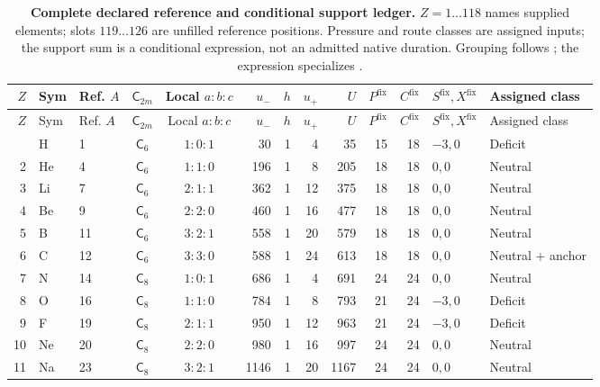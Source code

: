 {\scriptsize
\setlength{\tabcolsep}{3.0pt}
\begin{longtable}{@{}rllccrrrrrrll@{}}
\caption{\textbf{Complete declared reference and conditional support ledger.} $Z=1\dots118$ names supplied elements; slots $119\dots126$ are unfilled reference positions. Pressure and route classes are assigned inputs; the support sum is a conditional expression, not an admitted native duration. Grouping follows ; the expression specializes .}\label{tab:matter1-full-ledger}\\
\toprule
$Z$ & Sym & Ref. $A$ & $\mathsf{C}_{2m}$ & Local $a{:}b{:}c$ & $u_-$ & $h$ & $u_+$ & $U$ & $P^{\mathrm{fix}}$ & $C^{\mathrm{fix}}$ & $S^{\mathrm{fix}},X^{\mathrm{fix}}$ & Assigned class\\
\midrule
\endfirsthead
\toprule
$Z$ & Sym & Ref. $A$ & $\mathsf{C}_{2m}$ & Local $a{:}b{:}c$ & $u_-$ & $h$ & $u_+$ & $U$ & $P^{\mathrm{fix}}$ & $C^{\mathrm{fix}}$ & $S^{\mathrm{fix}},X^{\mathrm{fix}}$ & Assigned class\\
\midrule
\endhead
\bottomrule
\endfoot
1 & H & 1 & $\mathsf{C}_{6}$ & $1:0:1$ & 30 & 1 & 4 & 35 & 15 & 18 & $-3,0$ & Deficit\\
2 & He & 4 & $\mathsf{C}_{6}$ & $1:1:0$ & 196 & 1 & 8 & 205 & 18 & 18 & $0,0$ & Neutral\\
3 & Li & 7 & $\mathsf{C}_{6}$ & $2:1:1$ & 362 & 1 & 12 & 375 & 18 & 18 & $0,0$ & Neutral\\
4 & Be & 9 & $\mathsf{C}_{6}$ & $2:2:0$ & 460 & 1 & 16 & 477 & 18 & 18 & $0,0$ & Neutral\\
5 & B & 11 & $\mathsf{C}_{6}$ & $3:2:1$ & 558 & 1 & 20 & 579 & 18 & 18 & $0,0$ & Neutral\\
6 & C & 12 & $\mathsf{C}_{6}$ & $3:3:0$ & 588 & 1 & 24 & 613 & 18 & 18 & $0,0$ & Neutral + anchor\\
7 & N & 14 & $\mathsf{C}_{8}$ & $1:0:1$ & 686 & 1 & 4 & 691 & 24 & 24 & $0,0$ & Neutral\\
8 & O & 16 & $\mathsf{C}_{8}$ & $1:1:0$ & 784 & 1 & 8 & 793 & 21 & 24 & $-3,0$ & Deficit\\
9 & F & 19 & $\mathsf{C}_{8}$ & $2:1:1$ & 950 & 1 & 12 & 963 & 21 & 24 & $-3,0$ & Deficit\\
10 & Ne & 20 & $\mathsf{C}_{8}$ & $2:2:0$ & 980 & 1 & 16 & 997 & 24 & 24 & $0,0$ & Neutral\\
11 & Na & 23 & $\mathsf{C}_{8}$ & $3:2:1$ & 1146 & 1 & 20 & 1167 & 24 & 24 & $0,0$ & Neutral\\

\end{longtable}}
